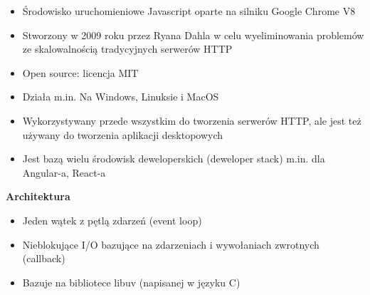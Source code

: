 \documentclass[../main.tex]{subfiles}
\begin{document}
    \begin{itemize}
        \item Środowisko uruchomieniowe Javascript oparte na silniku Google Chrome V8
        \item Stworzony w 2009 roku przez Ryana Dahla w celu wyeliminowania problemów ze skalowalnością tradycyjnych serwerów HTTP
        \item Open source: licencja MIT
        \item Działa m.in. Na Windows, Linuksie i MacOS
        \item Wykorzystywany przede wszystkim do tworzenia serwerów HTTP, ale jest też używany do tworzenia aplikacji desktopowych
        \item Jest bazą wielu środowisk deweloperskich (deweloper stack) m.in. dla Angular-a, React-a
    \end{itemize}

    \textbf{Architektura}
    \begin{itemize}
        \item Jeden wątek z pętlą zdarzeń (event loop)
        \item Nieblokujące I/O bazujące na zdarzeniach i wywołaniach zwrotnych (callback)
        \item Bazuje na bibliotece libuv (napisanej w języku C)
    \end{itemize}
\end{document}
